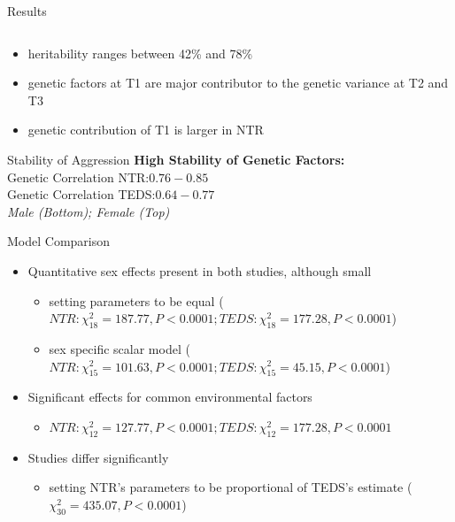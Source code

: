 \documentclass{beamer}
\begin{document}
\begin{frame}[t]{Results}
\begin{columns}
\begin{column}{0.5\textwidth}
\begin{center}
      \end{center} 
    \end{column}
  \end{columns}
  \begin{itemize}
    \item heritability ranges between 42\% and 78\%
    \item genetic factors at T1 are major contributor to the genetic
      variance at T2 and T3
    \item genetic contribution of T1 is larger in NTR
  \end{itemize}
\end{frame}

\begin{frame}[t]{Stability of Aggression}
  \textbf{High Stability of Genetic Factors:} \\
  Genetic Correlation NTR:\@ $0.76-0.85$ \\
  Genetic Correlation TEDS:\@ $0.64-0.77$ \\
  \vfill
  \vfill
  {\centering \textit{Male (Bottom); Female (Top)} }
\end{frame}

\begin{frame}[t]{Model Comparison}
  \begin{itemize}
    \item Quantitative sex effects present in both studies, although small
      \begin{itemize}
        \item setting parameters to be equal ($NTR: \chi^2_{18}=187.77, P< 0.0001; TEDS: \chi^2_{18}=177.28, P<0.0001$) 
        \item sex specific scalar model  ($NTR: \chi^2_{15}=101.63, P< 0.0001; TEDS: \chi^2_{15}=45.15, P<0.0001$)
      \end{itemize}
    \item Significant effects for common environmental factors
      \begin{itemize}
        \item $NTR: \chi^2_{12}=127.77, P<0.0001; TEDS: \chi^2_{12}=177.28, P<0.0001$
      \end{itemize}
    \item Studies differ significantly
      \begin{itemize}
        \item setting NTR's parameters to be proportional of TEDS's estimate ($\chi^2_{30}=435.07, P< 0.0001$)
      \end{itemize}
  \end{itemize}
\end{frame}
\end{document}

